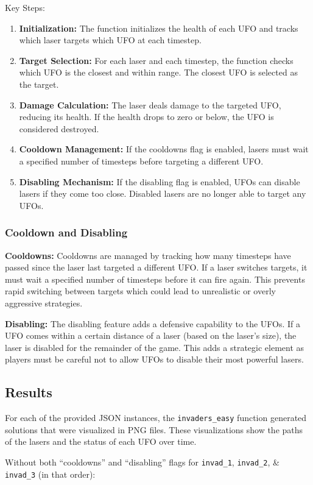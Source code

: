 \documentclass[12pt]{article}
\begin{document}
Key Steps:
\begin{enumerate}
    \item \textbf{Initialization:} The function initializes the health of each UFO and tracks which laser targets which UFO at each timestep.
    \item \textbf{Target Selection:} For each laser and each timestep, the function checks which UFO is the closest and within range. The closest UFO is selected as the target.
    \item \textbf{Damage Calculation:} The laser deals damage to the targeted UFO, reducing its health. If the health drops to zero or below, the UFO is considered destroyed.
    \item \textbf{Cooldown Management:} If the cooldowns flag is enabled, lasers must wait a specified number of timesteps before targeting a different UFO.
    \item \textbf{Disabling Mechanism:} If the disabling flag is enabled, UFOs can disable lasers if they come too close. Disabled lasers are no longer able to target any UFOs.
\end{enumerate}

\subsubsection{Cooldown and Disabling}
\textbf{Cooldowns:} Cooldowns are managed by tracking how many timesteps have passed since the laser last targeted a different UFO. If a laser switches targets, it must wait a specified number of timesteps before it can fire again. This prevents rapid switching between targets which could lead to unrealistic or overly aggressive strategies.

\textbf{Disabling:} The disabling feature adds a defensive capability to the UFOs. If a UFO comes within a certain distance of a laser (based on the laser's size), the laser is disabled for the remainder of the game. This adds a strategic element as players must be careful not to allow UFOs to disable their most powerful lasers.

\subsection{Results}
For each of the provided JSON instances, the \texttt{invaders\_easy} function generated solutions that were visualized in PNG files. These visualizations show the paths of the lasers and the status of each UFO over time.

Without both “cooldowns” and “disabling” flags for \texttt{invad\_1}, \texttt{invad\_2}, \& \texttt{invad\_3} (in that order):
\end{document}
